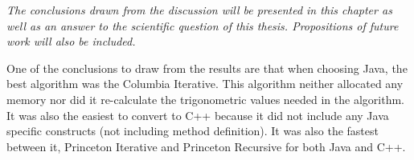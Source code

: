 \textit{The conclusions drawn from the discussion will be presented in this chapter as well as an answer to the scientific question of this thesis. Propositions of future work will also be included.}


One of the conclusions to draw from the results are that when choosing Java, the best algorithm was the Columbia Iterative. This algorithm neither allocated any memory nor did it re-calculate the trigonometric values needed in the algorithm. It was also the easiest to convert to C++ because it did not include any Java specific constructs (not including method definition). It was also the fastest between it, Princeton Iterative and Princeton Recursive for both Java and C++.




